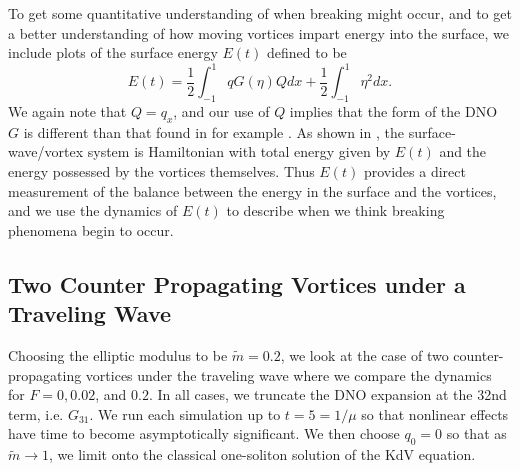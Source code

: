 \documentclass[a4paper,11pt]{article}
\begin{document}
To get some quantitative understanding of when breaking might occur, and to get a better understanding of how moving vortices impart energy into the surface, we include plots of the surface energy $E(t)$ defined to be 
\[
E(t) = \frac{1}{2}\int_{-1}^{1} q G(\eta)Q dx + \frac{1}{2}\int_{-1}^{1}\eta^{2}dx.
\] 
We again note that $Q = q_{x}$, and our use of $Q$ implies that the form of the DNO $G$ is different than that found in for example \cite{craig}.  As shown in \cite{rouhi}, the surface-wave/vortex system is Hamiltonian with total energy given by $E(t)$ and the energy possessed by the vortices themselves.  Thus $E(t)$ provides a direct measurement of the balance between the energy in the surface and the vortices, and we use the dynamics of $E(t)$ to describe when we think breaking phenomena begin to occur.   

\subsection{Two Counter Propagating Vortices under a Traveling Wave}

Choosing the elliptic modulus to be $\tilde{m}=0.2$, we look at the case of two counter-propagating vortices under the traveling wave where we compare the dynamics for $F=0, 0.02$, and $0.2$.  In all cases, we truncate the DNO expansion at the 32nd term, i.e. $G_{31}$.  We run each simulation up to $t=5=1/\mu$ so that nonlinear effects have time to become asymptotically significant.  We then choose $q_{0}=0$ so that as $\tilde{m}\rightarrow 1$, we limit onto the classical one-soliton solution of the KdV equation.      
\end{document}
